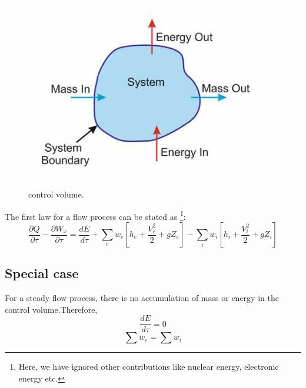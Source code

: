 \documentclass[12pt,letterpaper]{article}
\begin{document}
\begin{figure}
    \centering
    \includegraphics{FLoT.jpg}
    \caption{control volume.}
    \label{fig:myfigure}
\end{figure}



The first law for a flow process can be stated as \footnote{Here, we have ignored other contributions like nuclear energy, electronic energy etc.}:
\begin{equation}
    \frac{\partial Q}{\partial \tau} - \frac{\partial W_x}{\partial \tau} = \frac{dE}{d \tau} + \sum_e w_e[h_e + \frac{V_e^2}{2} + gZ_e] - \sum_i  w_i[h_i + \frac{V_i^2}{2} + gZ_i]
\end{equation}
\subsection{Special case}

For a steady flow process, there is no accumulation of mass or energy in the control volume.Therefore,
\[ \frac{dE}{d \tau} = 0\]
\[ \sum w_e = \sum w_i\]

\newpage


\end{document}

